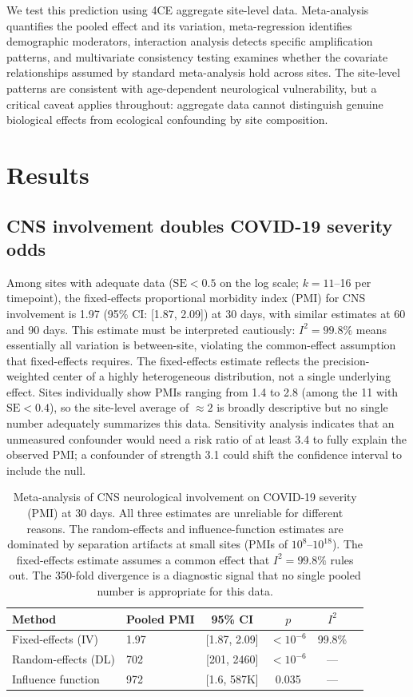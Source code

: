 \documentclass{article}
\begin{document}
We test this prediction using 4CE aggregate site-level data.
Meta-analysis quantifies the pooled effect and its variation, meta-regression identifies demographic moderators, interaction analysis detects specific amplification patterns, and multivariate consistency testing examines whether the covariate relationships assumed by standard meta-analysis hold across sites.
The site-level patterns are consistent with age-dependent neurological vulnerability, but a critical caveat applies throughout: aggregate data cannot distinguish genuine biological effects from ecological confounding by site composition.


\section{Results}

\subsection{CNS involvement doubles COVID-19 severity odds}

Among sites with adequate data ($\text{SE} < 0.5$ on the log scale; $k = 11$--16 per timepoint), the fixed-effects proportional morbidity index (PMI) for CNS involvement is 1.97 (95\% CI: [1.87, 2.09]) at 30 days, with similar estimates at 60 and 90 days.
This estimate must be interpreted cautiously: $I^2 = 99.8\%$ means essentially all variation is between-site, violating the common-effect assumption that fixed-effects requires.
The fixed-effects estimate reflects the precision-weighted center of a highly heterogeneous distribution, not a single underlying effect.
Sites individually show PMIs ranging from 1.4 to 2.8 (among the 11 with $\text{SE} < 0.4$), so the site-level average of $\approx 2$ is broadly descriptive but no single number adequately summarizes this data.
Sensitivity analysis \cite{vanderweele2017} indicates that an unmeasured confounder would need a risk ratio of at least 3.4 to fully explain the observed PMI; a confounder of strength 3.1 could shift the confidence interval to include the null.

\begin{table}[t]
\centering
\caption{Meta-analysis of CNS neurological involvement on COVID-19 severity (PMI) at 30 days. All three estimates are unreliable for different reasons. The random-effects and influence-function estimates are dominated by separation artifacts at small sites (PMIs of $10^{8}$--$10^{18}$). The fixed-effects estimate assumes a common effect that $I^2 = 99.8\%$ rules out. The 350-fold divergence is a diagnostic signal that no single pooled number is appropriate for this data.}
\label{tab:meta}
\begin{tabular}{llcccc}
\toprule
Method & Pooled PMI & 95\% CI & $p$ & $I^2$ \\
\midrule
Fixed-effects (IV) & 1.97 & [1.87, 2.09] & $< 10^{-6}$ & 99.8\% \\
Random-effects (DL) & 702 & [201, 2460] & $< 10^{-6}$ & --- \\
Influence function & 972 & [1.6, 587K] & 0.035 & --- \\
\bottomrule
\end{tabular}
\end{table}
\end{document}
